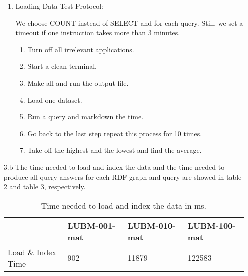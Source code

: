 \documentclass{article}
\begin{document}
\begin{enumerate}
\begin{enumerate}
\item 

Loading Data Test Protocol:

We choose COUNT instead of SELECT and for each query. Still, we set a timeout if one instruction takes more than 3 minutes. 

\begin{enumerate}
\item Turn off all irrelevant applications.
\item Start a clean terminal.
\item Make all and run the output file.
\item Load one dataset. 
\item Run a query and markdown the time. 
\item Go back to the last step repeat this process for 10 times. 
\item Take off the highest and the lowest and find the average. 


\end{enumerate}


\end{enumerate}

\item[3.b] The time needed to load and index the data and the time needed to produce all query answers for each RDF graph and query are showed in table 2 and table 3, respectively.

\begin{table}[H]\centering
\begin{tabular}{|l|l|l|l|}
\hline
                   & LUBM-001-mat & LUBM-010-mat & LUBM-100-mat \\ \hline
Load \& Index Time & 902         & 11879        & 122583       \\ \hline
\end{tabular}
\caption{Time needed to load and index the data in ms.}
\end{table}




\end{enumerate}
\end{document}
